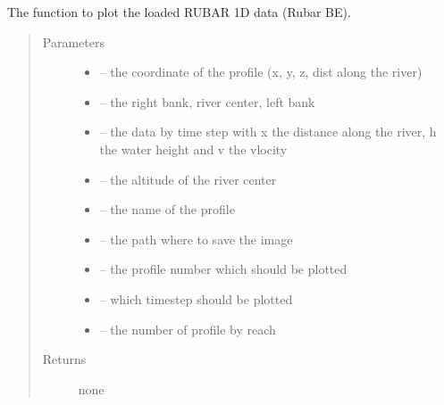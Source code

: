 \documentclass[letterpaper,10pt,english]{sphinxmanual}
\begin{document}
\begin{fulllineitems}
\label{\detokenize{index:src.rubar.figure_rubar1d}}
The function to plot the loaded RUBAR 1D data (Rubar BE).
\begin{quote}\begin{description}
\item[{Parameters}] \leavevmode\begin{itemize}
\item {} 
 -- the coordinate of the profile (x, y, z, dist along the river)

\item {} 
 -- the right bank, river center, left bank

\item {} 
 -- the data by time step with x the distance along the river, h the water height and v the vlocity

\item {} 
 -- the altitude of the river center

\item {} 
 -- the name of the profile

\item {} 
 -- the path where to save the image

\item {} 
 -- the profile number which should be plotted

\item {} 
 -- which timestep should be plotted

\item {} 
 -- the number of profile by reach

\end{itemize}

\item[{Returns}] \leavevmode
none

\end{description}\end{quote}

\end{fulllineitems}
\end{document}
